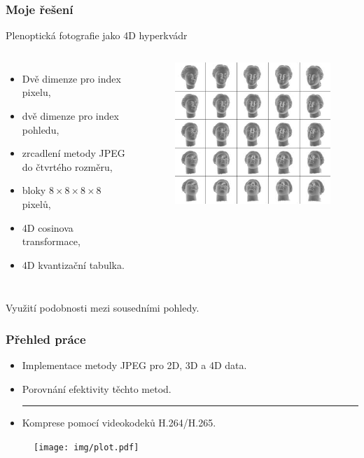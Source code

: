 \documentclass[10pt,xcolor=pdflatex]{beamer}
\begin{document}
\begin{frame}\frametitle{Moje řešení}
  \begin{center}
    {\Large Plenoptická fotografie jako 4D hyperkvádr}
    \begin{columns}
        \begin{itemize}
          \item Dvě dimenze pro index pixelu,
          \item dvě dimenze pro index pohledu,
          \item zrcadlení metody JPEG do čtvrtého rozměru,
          \item bloky $8 \times 8 \times 8 \times 8$ pixelů,
          \item 4D cosinova transformace,
          \item 4D kvantizační tabulka.
        \end{itemize}
        \begin{figure}
          \includegraphics[width=\textwidth]{img/head.png}
        \end{figure}
    \end{columns}
    \vfill
    Využití podobnosti mezi sousedními pohledy.
  \end{center}
\end{frame}

\begin{frame}\frametitle{Přehled práce}
  \begin{itemize}
    \item Implementace metody JPEG pro 2D, 3D a 4D data.
    \item Porovnání efektivity těchto metod.
    \rule{\linewidth}{0.4pt}
    \item Komprese pomocí videokodeků H.264/H.265.
  \end{itemize}
  \begin{figure}
    \texttt{[image: img/plot.pdf]}
  \end{figure}
\end{frame}


\end{document}
